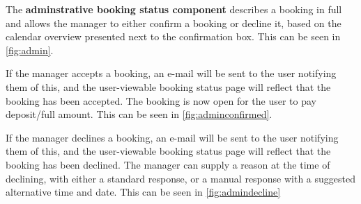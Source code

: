 The \textbf{adminstrative booking status component} describes a booking in full and allows the
\gomonkey{} manager to either confirm a booking or decline it, based on the 
calendar overview presented next to the confirmation box. This can be seen in
\autoref{fig:admin}. 

If the manager accepts a booking, an e-mail will be sent to the user notifying 
them of this, and the user-viewable booking status page will reflect that the 
booking has been accepted. The booking is now open for the user to pay 
deposit/full amount. This can be seen in \autoref{fig:adminconfirmed}.

If the manager declines a booking, an e-mail will be sent to the user notifying 
them of this, and the user-viewable booking status page will reflect that the 
booking has been declined. The manager can supply a reason at the time of 
declining, with either a standard response, or a manual response with a
suggested alternative time and date. This can be seen in \autoref{fig:admindecline}

